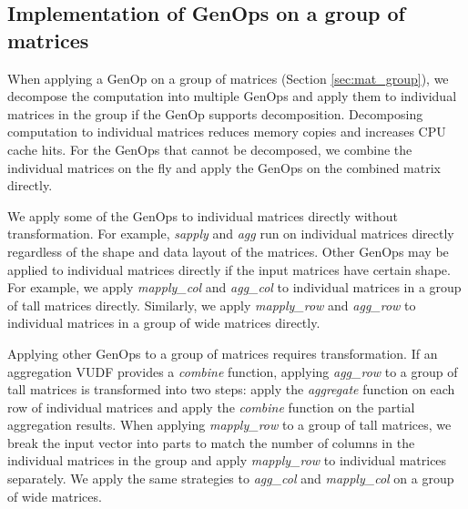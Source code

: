 \subsection{Implementation of GenOps on a group of matrices} \label{sec:group_op}

When applying a GenOp on a group of matrices (Section \ref{sec:mat_group}),
we decompose the computation into multiple GenOps and apply them to individual
matrices in the group if the GenOp supports decomposition. Decomposing computation
to individual matrices reduces memory copies and increases CPU cache hits.
For the GenOps that cannot be decomposed, we combine the individual matrices
on the fly and apply the GenOps on the combined matrix directly.

We apply some of the GenOps to individual matrices directly without
transformation. For example,
\textit{sapply} and \textit{agg} run on individual matrices directly regardless
of the shape and data layout of the matrices. Other GenOps may be applied
to individual matrices directly if the input matrices have certain shape. For
example, we apply \textit{mapply\_col} and \textit{agg\_col} to individual
matrices in a group of tall matrices directly.  Similarly, we apply
\textit{mapply\_row} and \textit{agg\_row} to
individual matrices in a group of wide matrices directly. %

Applying other GenOps to a group of matrices requires transformation. If an aggregation
VUDF provides a \textit{combine} function, applying \textit{agg\_row} to a group of
tall matrices is transformed into two steps: apply the \textit{aggregate} function on
each row of individual matrices and apply the \textit{combine} function on the partial
aggregation results. When applying \textit{mapply\_row} to a group of tall matrices,
we break the input vector into parts to match the number of columns in the individual
matrices in the group and apply \textit{mapply\_row} to individual matrices
separately. We apply the same strategies to \textit{agg\_col} and
\textit{mapply\_col} on a group of wide matrices. 

